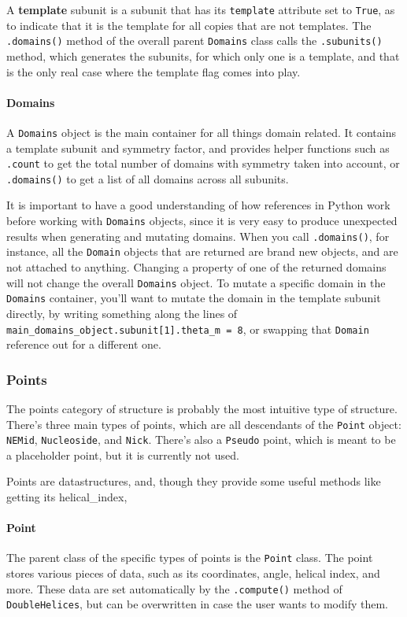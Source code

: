 \documentclass[titlepage]{article}
\begin{document}
	A \textbf{template} subunit is a subunit that has its \texttt{template} attribute set to \texttt{True}, as to indicate that it is the template for all copies that are not templates. The \texttt{.domains()} method of the overall parent \texttt{Domains} class calls the \texttt{.subunits()} method, which generates the subunits, for which only one is a template, and that is the only real case where the template flag comes into play.
	
	\paragraph{Domains}
	A \texttt{Domains} object is the main container for all things domain related. It contains a template subunit and symmetry factor, and provides helper functions such as \texttt{.count} to get the total number of domains with symmetry taken into account, or \texttt{.domains()} to get a list of all domains across all subunits.
	
	It is important to have a good understanding of how references in Python work before working with \texttt{Domains} objects, since it is very easy to produce unexpected results when generating and mutating domains. When you call \texttt{.domains()}, for instance, all the \texttt{Domain} objects that are returned are brand new objects, and are not attached to anything. Changing a property of one of the returned domains will not change the overall \texttt{Domains} object. To mutate a specific domain in the \texttt{Domains} container, you'll want to mutate the domain in the template subunit directly, by writing something along the lines of \texttt{main\_domains\_object.subunit[1].theta\_m = 8}, or swapping that \texttt{Domain} reference out for a different one.
	
	\subsubsection{Points}
	The points category of structure is probably the most intuitive type of structure. There's three main types of points, which are all descendants of the \texttt{Point} object: \texttt{NEMid}, \texttt{Nucleoside}, and \texttt{Nick}. There's also a \texttt{Pseudo} point, which is meant to be a placeholder point, but it is currently not used.
	
	Points are datastructures, and, though they provide some useful methods like getting its helical\_index, 
	
	\paragraph{Point}
	The parent class of the specific types of points is the \texttt{Point} class. The point stores various pieces of data, such as its coordinates, angle, helical index, and more. These data are set automatically by the \texttt{.compute()} method of \texttt{DoubleHelices}, but can be overwritten in case the user wants to modify them.
	
\end{document}
